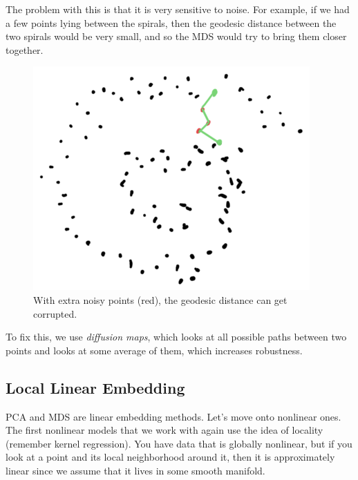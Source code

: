 \documentclass{article}
\begin{document}
      The problem with this is that it is very sensitive to noise. For example, if we had a few points lying between the spirals, then the geodesic distance between the two spirals would be very small, and so the MDS would try to bring them closer together.  

      \begin{figure}[H]
        \centering 
        \includegraphics[scale=0.4]{img/isomap_problem.png}
        \caption{With extra noisy points (red), the geodesic distance can get corrupted.} 
        \label{fig:isomap_problem}
      \end{figure}

      To fix this, we use \textit{diffusion maps}, which looks at all possible paths between two points and looks at some average of them, which increases robustness. 

  \subsection{Local Linear Embedding} 

    PCA and MDS are linear embedding methods. Let's move onto nonlinear ones. The first nonlinear models that we work with again use the idea of locality (remember kernel regression). You have data that is globally nonlinear, but if you look at a point and its local neighborhood around it, then it is approximately linear since we assume that it lives in some smooth manifold. 
\end{document}
